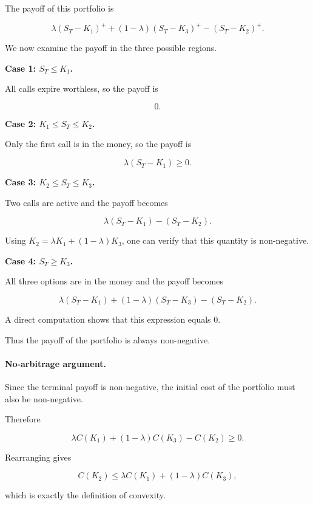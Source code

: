\documentclass[11pt]{article}
\newcommand{\1}{\mathbf{1}}
\theoremstyle{plain}
\theoremstyle{definition}
\theoremstyle{remark}
\begin{document}
The payoff of this portfolio is

\[
\lambda (S_T-K_1)^+
+
(1-\lambda)(S_T-K_3)^+
-
(S_T-K_2)^+ .
\]

We now examine the payoff in the three possible regions.

\medskip

\textbf{Case 1: \(S_T \le K_1\).}

All calls expire worthless, so the payoff is

\[
0.
\]

\medskip

\textbf{Case 2: \(K_1 \le S_T \le K_2\).}

Only the first call is in the money, so the payoff is

\[
\lambda (S_T-K_1) \ge 0 .
\]

\medskip

\textbf{Case 3: \(K_2 \le S_T \le K_3\).}

Two calls are active and the payoff becomes

\[
\lambda (S_T-K_1) - (S_T-K_2).
\]

Using \(K_2=\lambda K_1+(1-\lambda)K_3\), one can verify that this quantity
is non-negative.

\medskip

\textbf{Case 4: \(S_T \ge K_3\).}

All three options are in the money and the payoff becomes

\[
\lambda (S_T-K_1)
+
(1-\lambda)(S_T-K_3)
-
(S_T-K_2).
\]

A direct computation shows that this expression equals \(0\).

\medskip

Thus the payoff of the portfolio is always non-negative.

\paragraph{No-arbitrage argument.}

Since the terminal payoff is non-negative, the initial cost of the
portfolio must also be non-negative.

Therefore

\[
\lambda C(K_1)
+
(1-\lambda)C(K_3)
-
C(K_2)
\ge 0.
\]

Rearranging gives

\[
C(K_2)
\le
\lambda C(K_1)
+
(1-\lambda)C(K_3),
\]

which is exactly the definition of convexity.
\end{document}

